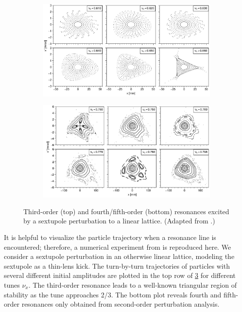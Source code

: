 \begin{figure}[!p]
    \begin{subfigure}[b]{1.0\textwidth}
        \includegraphics[width=\textwidth]{Images/chapter1/sextupole.png}
        \label{fig:sextupole_a}
    \end{subfigure}
    \vfill
    \vspace*{1.0cm}
    \vfill
    \begin{subfigure}[b]{\textwidth}
        \centering
        \includegraphics[width=\textwidth]{Images/chapter1/sextupole_second_order.png}
        \label{fig:sextupole_b}
    \end{subfigure}
    \caption{Third-order (top) and fourth/fifth-order (bottom) resonances excited by a sextupole perturbation to a linear lattice. (Adapted from \cite{Lee2011}.)}
    \label{fig:sextupole}
\end{figure}
%

It is helpful to visualize the particle trajectory when a resonance line is encountered; therefore, a numerical experiment from \cite{Lee2011} is reproduced here. We consider a sextupole perturbation in an otherwise linear lattice, modeling the sextupole as a thin-lens kick. The turn-by-turn trajectories of particles with several different initial amplitudes are plotted in the top row of \ref{fig:sextupole} for different tunes $\nu_x$. The third-order resonance leads to a well-known triangular region of stability as the tune approaches 2/3. The bottom plot reveals fourth and fifth-order resonances only obtained from second-order perturbation analysis. 